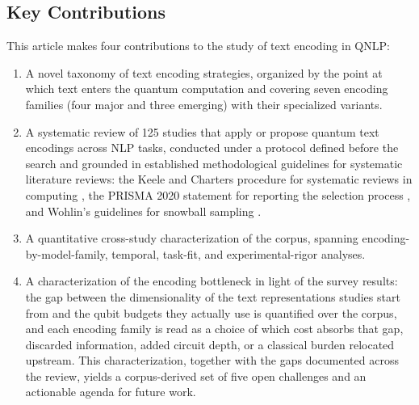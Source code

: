\documentclass{ieeeaccess}
\begin{document}
\subsection{Key Contributions}
This article makes four contributions to the study of text encoding in QNLP:
\begin{enumerate}
\item[1)] A novel taxonomy of text encoding strategies, organized by the point at which text enters the quantum computation and covering seven encoding families (four major and three emerging) with their specialized variants.
\item[2)] A systematic review of 125 studies that apply or propose quantum text encodings across NLP tasks, conducted under a protocol defined before the search and grounded in established methodological guidelines for systematic literature reviews: the Keele and Charters procedure for systematic reviews in computing \cite{keele2007guidelines}, the PRISMA 2020 statement for reporting the selection process \cite{page2021prisma}, and Wohlin's guidelines for snowball sampling \cite{wohlin2014guidelines}.
\item[3)] A quantitative cross-study characterization of the corpus, spanning encoding-by-model-family, temporal, task-fit, and experimental-rigor analyses.
\item[4)] A characterization of the encoding bottleneck in light of the survey results: the gap between the dimensionality of the text representations studies start from and the qubit budgets they actually use is quantified over the corpus, and each encoding family is read as a choice of which cost absorbs that gap, discarded information, added circuit depth, or a classical burden relocated upstream. This characterization, together with the gaps documented across the review, yields a corpus-derived set of five open challenges and an actionable agenda for future work.
\end{enumerate}
\end{document}
